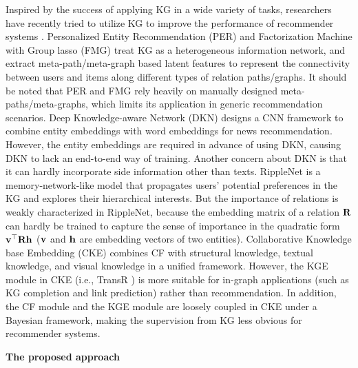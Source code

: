 \documentclass[sigconf]{acmart}
\begin{document}
	Inspired by the success of applying KG in a wide variety of tasks, researchers have recently tried to utilize KG to improve the performance of recommender systems \cite{yu2014personalized,zhao2017meta,wang2018dkn,wang2018ripple,zhang2016collaborative}.
	Personalized Entity Recommendation (PER) \cite{yu2014personalized} and Factorization Machine with Group lasso (FMG) \cite{zhao2017meta} treat KG as a heterogeneous information network, and extract meta-path/meta-graph based latent features to represent the connectivity between users and items along different types of relation paths/graphs.
	It should be noted that PER and FMG rely heavily on manually designed meta-paths/meta-graphs, which limits its application in generic recommendation scenarios.
	Deep Knowledge-aware Network (DKN) \cite{wang2018dkn} designs a CNN framework to combine entity embeddings with word embeddings for news recommendation.
	However, the entity embeddings are required in advance of using DKN, causing DKN to lack an end-to-end way of training.
	Another concern about DKN is that it can hardly incorporate side information other than texts.
	RippleNet \cite{wang2018ripple} is a memory-network-like model that propagates users' potential preferences in the KG and explores their hierarchical interests.
	But the importance of relations is weakly characterized in RippleNet, because the embedding matrix of a relation $\bf R$ can hardly be trained to capture the sense of importance in the quadratic form ${\bf v}^\top {\bf R} {\bf h}$ ($\bf v$ and $\bf h$ are embedding vectors of two entities).
Collaborative Knowledge base Embedding (CKE) \cite{zhang2016collaborative} combines CF with structural knowledge, textual knowledge, and visual knowledge in a unified framework.
	However, the KGE module in CKE (i.e., TransR \cite{lin2015learning}) is more suitable for in-graph applications (such as KG completion and link prediction) rather than recommendation.
	In addition, the CF module and the KGE module are loosely coupled in CKE under a Bayesian framework, making the supervision from KG less obvious for recommender systems.
	
	\vspace{0.5em}
	\noindent\textbf{The proposed approach}	
	
\end{document}
